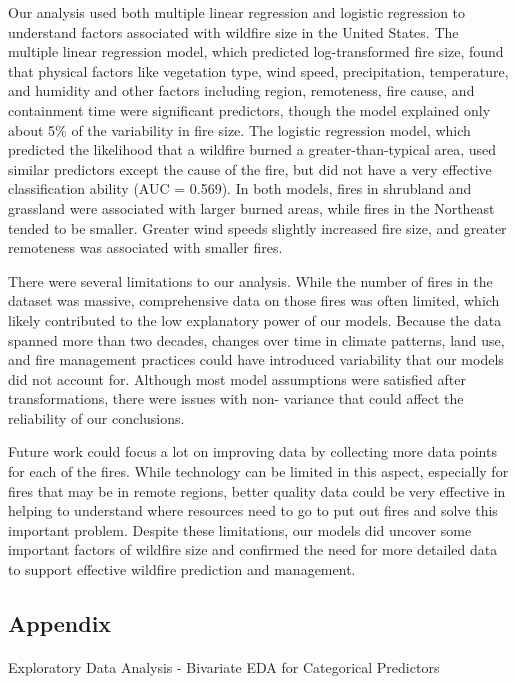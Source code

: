 \documentclass[
  letterpaper,
  DIV=11,
  numbers=noendperiod]{scrartcl}
\makeatletter
\let\oldparagraph\paragraph
\renewcommand{\paragraph}{
    \@ifstar
      \xxxParagraphStar
      \xxxParagraphNoStar
  }
\newcommand{\xxxParagraphStar}[1]{\oldparagraph*{#1}\mbox{}}
\newcommand{\xxxParagraphNoStar}[1]{\oldparagraph{#1}\mbox{}}
\makeatother
\begin{document}
Our analysis used both multiple linear regression and logistic
regression to understand factors associated with wildfire size in the
United States. The multiple linear regression model, which predicted
log-transformed fire size, found that physical factors like vegetation
type, wind speed, precipitation, temperature, and humidity and other
factors including region, remoteness, fire cause, and containment time
were significant predictors, though the model explained only about 5\%
of the variability in fire size. The logistic regression model, which
predicted the likelihood that a wildfire burned a greater-than-typical
area, used similar predictors except the cause of the fire, but did not
have a very effective classification ability (AUC = 0.569). In both
models, fires in shrubland and grassland were associated with larger
burned areas, while fires in the Northeast tended to be smaller. Greater
wind speeds slightly increased fire size, and greater remoteness was
associated with smaller fires.

There were several limitations to our analysis. While the number of
fires in the dataset was massive, comprehensive data on those fires was
often limited, which likely contributed to the low explanatory power of
our models. Because the data spanned more than two decades, changes over
time in climate patterns, land use, and fire management practices could
have introduced variability that our models did not account for.
Although most model assumptions were satisfied after transformations,
there were issues with non- variance that could affect the reliability
of our conclusions.

Future work could focus a lot on improving data by collecting more data
points for each of the fires. While technology can be limited in this
aspect, especially for fires that may be in remote regions, better
quality data could be very effective in helping to understand where
resources need to go to put out fires and solve this important problem.
Despite these limitations, our models did uncover some important factors
of wildfire size and confirmed the need for more detailed data to
support effective wildfire prediction and management.

\newpage

\subsection{Appendix}\label{appendix}

\paragraph{Exploratory Data Analysis - Bivariate EDA for Categorical
Predictors}\label{exploratory-data-analysis---bivariate-eda-for-categorical-predictors}
\end{document}
